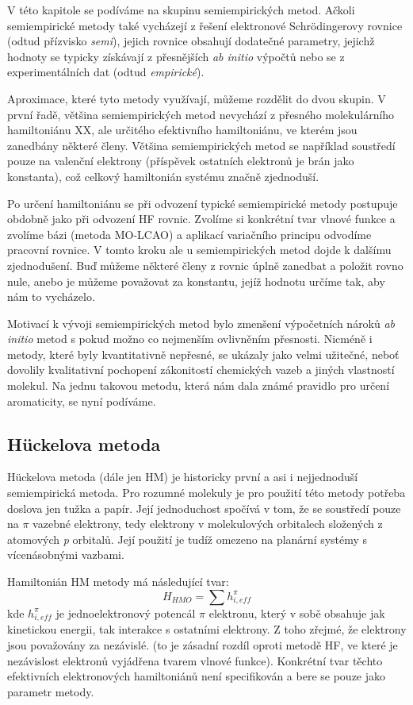 V této kapitole se podíváme na skupinu semiempirických metod. Ačkoli semiempirické metody také vycházejí z řešení elektronové Schr\"{o}dingerovy rovnice (odtud přízvisko \textit{semi}), jejich rovnice obsahují dodatečné parametry, jejichž hodnoty se typicky získávají z přesnějších \textit{ab initio} výpočtů nebo se z experimentálních dat (odtud \textit{empirické}).

Aproximace, které tyto metody využívají, můžeme rozdělit do dvou skupin. V první řadě, většina semiempirických metod nevychází z přesného molekulárního hamiltoniánu XX, ale určitého efektivního hamiltoniánu, ve kterém jsou zanedbány některé členy. Většina semiempirických metod se například soustředí pouze na valenční elektrony (příspěvek ostatních elektronů je brán jako konstanta), což celkový hamiltonián systému značně zjednoduší.

Po určení hamiltoniánu se při odvození typické semiempirické metody postupuje obdobně jako při odvození HF rovnic. Zvolíme si konkrétní tvar vlnové funkce a zvolíme bázi (metoda MO-LCAO) a aplikací variačního principu odvodíme pracovní rovnice. V tomto kroku ale u semiempirických metod dojde k dalšímu zjednodušení. Buď můžeme některé členy z rovnic úplně zanedbat a položit rovno nule, anebo je můžeme považovat za konstantu, jejíž hodnotu určíme tak, aby nám to vycházelo.   

Motivací k vývoji semiempirických metod bylo zmenšení výpočetních nároků \textit{ab initio} metod s pokud možno co nejmenším ovlivněním přesnosti. Nicméně i metody, které byly kvantitativně nepřesné, se ukázaly jako velmi užitečné, neboť dovolily kvalitativní pochopení zákonitostí chemických vazeb a jiných vlastností molekul. Na jednu takovou metodu, která nám dala známé pravidlo  pro určení aromaticity, se nyní podíváme.

\subsection{H\"{u}ckelova metoda}

H\"{u}ckelova metoda (dále jen HM) je historicky první a asi i nejjednoduší semiempirická metoda. Pro rozumné molekuly je pro použití této metody potřeba doslova jen tužka a papír. Její jednoduchost spočívá v tom, že se soustředí pouze na $\pi$ vazebné elektrony,
tedy elektrony v molekulových orbitalech složených z atomových \textit{p} orbitalů.
Její použití je tudíž omezeno na planární systémy s vícenásobnými vazbami. 

Hamiltonián HM metody má následující tvar:
\begin{equation}
H_{HMO}= \sum h_{i, eff}^\pi
\label{rov:Ham_HM}
\end{equation}
kde $h_{i, eff}^\pi$ je jednoelektronový potencál $\pi$ elektronu, který v sobě obsahuje jak kinetickou energii, tak interakce s ostatními elektrony.
Z toho zřejmé, že elektrony jsou považovány za nezávislé. (to je zásadní rozdíl oproti metodě HF, ve které je nezávislost elektronů vyjádřena  tvarem vlnové funkce). 
Konkrétní tvar těchto efektivních elektronových hamiltoniánů není specifikován a bere se pouze jako parametr metody. 


